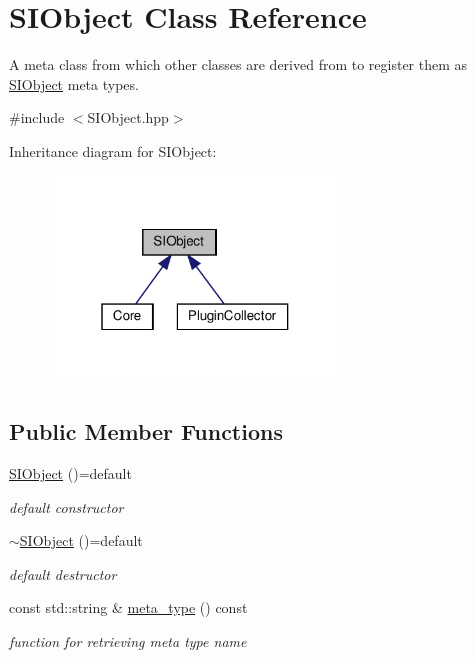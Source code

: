 \hypertarget{class_s_i_object}{}\section{S\+I\+Object Class Reference}
\label{class_s_i_object}


A meta class from which other classes are derived from to register them as \mbox{\hyperlink{class_s_i_object}{S\+I\+Object}} meta types.  




{\ttfamily \#include $<$S\+I\+Object.\+hpp$>$}



Inheritance diagram for S\+I\+Object\+:\nopagebreak
\begin{figure}[H]
\begin{center}
\leavevmode
\includegraphics[width=220pt]{class_s_i_object__inherit__graph}
\end{center}
\end{figure}
\subsection*{Public Member Functions}
\begin{DoxyCompactItemize}
\item 
\mbox{\hyperlink{class_s_i_object_adf4ffbccc68e2c85a0f56774830e7a86}{S\+I\+Object}} ()=default
\begin{DoxyCompactList}\small\item\em default constructor \end{DoxyCompactList}\item 
\mbox{\hyperlink{class_s_i_object_a3b91c3651ce742f783f9cb48117d28c3}{$\sim$\+S\+I\+Object}} ()=default
\begin{DoxyCompactList}\small\item\em default destructor \end{DoxyCompactList}\item 
const std\+::string \& \mbox{\hyperlink{class_s_i_object_a0edd00788cf10f707b47f080c69773f9}{meta\+\_\+type}} () const
\begin{DoxyCompactList}\small\item\em function for retrieving meta type name \end{DoxyCompactList}\end{DoxyCompactItemize}
